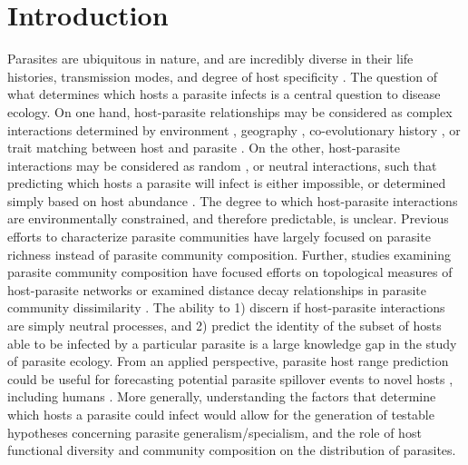 \documentclass[12pt]{article}
\begin{document}
 
\section*{Introduction}


Parasites are ubiquitous in nature, and are incredibly diverse in their life histories, transmission modes, and degree of host specificity \cite{poulin2011}. The question of what determines which hosts a parasite infects is a central question to disease ecology. On one hand, host-parasite relationships may be considered as complex interactions determined by environment \cite{locke2013}, geography \cite{nieberding2008}, co-evolutionary history \cite{krasnov2012}, or trait matching between host and parasite \cite{rohr2013}. On the other, host-parasite interactions may be considered as random \cite{kennedy2009}, or neutral interactions, such that predicting which hosts a parasite will infect is either impossible, or determined simply based on host abundance \cite{canard2014}. The degree to which host-parasite interactions are environmentally constrained, and therefore predictable, is unclear. Previous efforts to characterize parasite communities have largely focused on parasite richness \cite{arneberg2002,nunn2003,ezenwa2006,poulin1997} instead of parasite community composition. Further, studies examining parasite community composition have focused efforts on topological measures of host-parasite networks \cite{guegan1994, canard2014, krasnov2012, poulin2010} or examined distance decay relationships in parasite community dissimilarity \cite{locke2012, locke2013, poulin2003}. The ability to 1) discern if host-parasite interactions are simply neutral processes, and 2) predict the identity of the subset of hosts able to be infected by a particular parasite is a large knowledge gap in the study of parasite ecology. From an applied perspective, parasite host range prediction could be useful for forecasting potential parasite spillover events to novel hosts \cite{colautti2004}, including humans \cite{daszak2000}. More generally, understanding the factors that determine which hosts a parasite could infect would allow for the generation of testable hypotheses concerning parasite generalism/specialism, and the role of host functional diversity and community composition on the distribution of parasites.   \\
\end{document}
